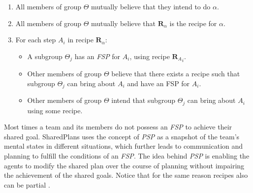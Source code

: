 \documentclass[12pt]{report}
\begin{document}
\begin{enumerate}
  \item All members of group $\Theta$ mutually believe that they intend to do
  $\alpha$.
  \item All members of group $\Theta$ mutually believe that
  \textit{$\textbf{R}_\alpha$} is the recipe for $\alpha$.
  \item For each step \textit{$A_i$} in recipe \textit{$\textbf{R}_\alpha$}:
  \begin{itemize}
    \item A subgroup $\Theta_j$ has an \textit{FSP} for \textit{$A_i$}, using
    recipe \textit{${\textbf{R}_A}_i$}.
    \item Other members of group $\Theta$ believe that there exists a recipe
    such that subgroup $\Theta_j$ can bring about \textit{$A_i$} and have an FSP
    for \textit{$A_i$}.
    \item Other members of group $\Theta$ intend that subgroup $\Theta_j$ can
    bring about \textit{$A_i$} using some recipe.
  \end{itemize}
\end{enumerate}

Most times a team and its members do not possess an \textit{FSP} to achieve
their shared goal. SharedPlans uses the concept of \textit{PSP} as a snapshot of
the team's mental states in different situations, which further leads to
communication and planning to fulfill the conditions of an \textit{FSP}. The
idea behind \textit{PSP} is enabling the agents to modify the shared plan over
the course of planning without impairing the achievement of the shared goals.
Notice that for the same reason recipes also can be partial
\cite{grosz:collaboration, grosz:plans-discourse}.
\end{document}
